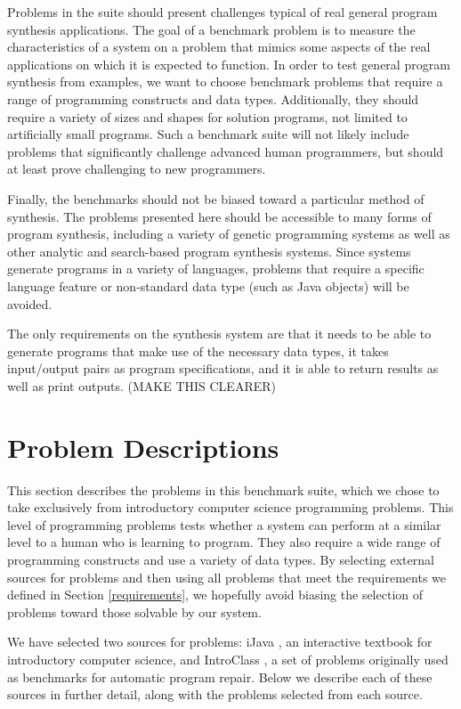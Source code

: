 \documentclass{sig-alternate}
\begin{document}
Problems in the suite should present challenges typical of real general program synthesis applications. The goal of a benchmark problem is to measure the characteristics of a system on a problem that mimics some aspects of the real applications on which it is expected to function. In order to test general program synthesis from examples, we want to choose benchmark problems that require a range of programming constructs and data types. Additionally, they should require a variety of sizes and shapes for solution programs, not limited to artificially small programs. Such a benchmark suite will not likely include problems that significantly challenge advanced human programmers, but should at least prove challenging to new programmers.

Finally, the benchmarks should not be biased toward a particular method of synthesis. The problems presented here should be accessible to many forms of program synthesis, including a variety of genetic programming systems as well as other analytic and search-based program synthesis systems. Since systems generate programs in a variety of languages, problems that require a specific language feature or non-standard data type (such as Java objects) will be avoided.

The only requirements on the synthesis system are that it needs to be able to generate programs that make use of the necessary data types, it takes input/output pairs as program specifications, and it is able to return results as well as print outputs. (MAKE THIS CLEARER)

\section{Problem Descriptions} \label{descriptionsSection}

This section describes the problems in this benchmark suite, which we chose to take exclusively from introductory computer science programming problems. This level of programming problems tests whether a system can perform at a similar level to a human who is learning to program. They also require a wide range of programming constructs and use a variety of data types. By selecting external sources for problems and then using all problems that meet the requirements we defined in Section \ref{requirements}, we hopefully avoid biasing the selection of problems toward those solvable by our system.

We have selected two sources for problems: iJava \cite{iJava}, an interactive textbook for introductory computer science, and IntroClass \cite{ManyBugsAndIntroClass, Brun13TRgptest}, a set of problems originally used as benchmarks for automatic program repair. Below we describe each of these sources in further detail, along with the problems selected from each source.
\end{document}
